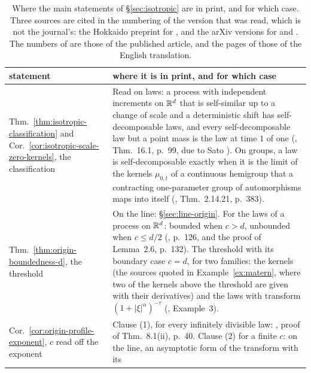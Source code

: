 {\renewcommand{\arraystretch}{0.81}
\begin{longtable}{@{}S{0.2\textwidth}S{0.76\textwidth}@{}}
\toprule
statement & where it is in print, and for which case \\
\midrule
\endhead
\bottomrule
\endfoot
\bottomrule
\addlinespace
\caption{Where the main statements of \S\ref{sec:isotropic} are in print, and for which case.
Three sources are cited in the numbering of the version that was read, which is not the
journal's: the Hokkaido preprint for , and the arXiv versions for
 and . The numbers of
 are those of the published article, and the pages of
 those of the English translation.}
\label{tab:in-print}
\endlastfoot
Thm.~\ref{thm:isotropic-classification} and Cor.~\ref{cor:isotropic-scale-zero-kernels}, the
classification &
  Read on laws: a process with independent increments on $\mathbb{R}^d$ that is self-similar up to a
  change of scale and a deterministic shift has self-decomposable laws, and every
  self-decomposable law but a point mass is the law at time $1$ of one
  (, Thm.~16.1, p.~99, due to Sato ). On
  groups, a law is self-decomposable exactly when it is the limit of the kernels $\mu_{0,t}$ of
  a continuous hemigroup that a contracting one-parameter group of automorphisms maps into
  itself (, Thm.~2.14.21, p.~383). \\
\addlinespace
Thm.~\ref{thm:origin-boundedness-d}, the threshold &
  On the line: \S\ref{sec:line-origin}. For the laws of a \Levy{} process on $\mathbb{R}^d$: bounded
  when $c > d$, unbounded when $c \le d/2$ (, p.~126, and the proof of
  Lemma~2.6, p.~132). The threshold with its boundary case $c = d$, for two families: the
  \Matern{} kernels (the sources quoted in Example~\ref{ex:matern}, where two of the kernels
  above the threshold are given with their derivatives) and the laws with transform
  $(1 + |\xi|^\alpha)^{-\tau}$ (, Example~3). \\
\addlinespace
Cor.~\ref{cor:origin-profile-exponent}, $c$ read off the exponent &
  Clause (1), for every infinitely divisible law: , proof of Thm.~8.1(ii),
  p.~40. Clause (2) for a finite $c$: on the line, an asymptotic form of the transform with its

\end{longtable}}
